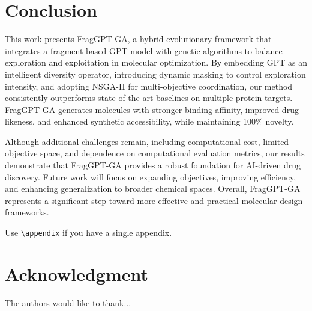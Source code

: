 \documentclass[lettersize,journal]{IEEEtran}
\begin{document}
\section{Conclusion}

This work presents FragGPT-GA, a hybrid evolutionary framework that integrates a fragment-based GPT model with genetic algorithms to balance exploration and exploitation in molecular optimization. By embedding GPT as an intelligent diversity operator, introducing dynamic masking to control exploration intensity, and adopting NSGA-II\cite{deb2002fast} for multi-objective coordination, our method consistently outperforms state-of-the-art baselines on multiple protein targets. FragGPT-GA generates molecules with stronger binding affinity, improved drug-likeness, and enhanced synthetic accessibility, while maintaining 100\% novelty. 

Although additional challenges remain, including computational cost, limited objective space, and dependence on computational evaluation metrics, our results demonstrate that FragGPT-GA provides a robust foundation for AI-driven drug discovery. Future work will focus on expanding objectives, improving efficiency, and enhancing generalization to broader chemical spaces. Overall, FragGPT-GA represents a significant step toward more effective and practical molecular design frameworks.

Use \verb|\appendix| if you have a single appendix.

\section*{Acknowledgment}
The authors would like to thank...

\balance

\nocite{*} %


\end{document}
